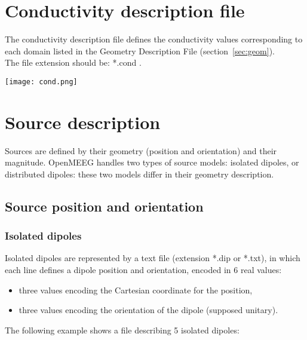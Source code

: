 \section{Conductivity description file}
\label{sec:cond}

\noindent
The conductivity description file defines the conductivity values corresponding to each domain listed in the Geometry Description File (section~\ref{sec:geom}).
\\ 
The file extension should be: *.cond .\\


\centerline{\texttt{[image: cond.png]}}


\section{Source description}
Sources are defined by their geometry (position and orientation)  and their magnitude.
OpenMEEG handles two types of source models: isolated dipoles, or distributed dipoles: these two models differ in their geometry description.
\subsection{Source position and orientation}
\label{sec:dipoles}
\subsubsection{Isolated dipoles}
\noindent
Isolated dipoles are represented by a text file (extension *.dip or *.txt), in which each line defines a dipole position and orientation, encoded in 6 real values:

\begin{itemize}
    \item three values encoding the Cartesian coordinate for the position,
    \item three values encoding the orientation of the dipole (supposed unitary).
\end{itemize}

\medskip

\noindent
The following example shows a file describing 5 isolated dipoles:

